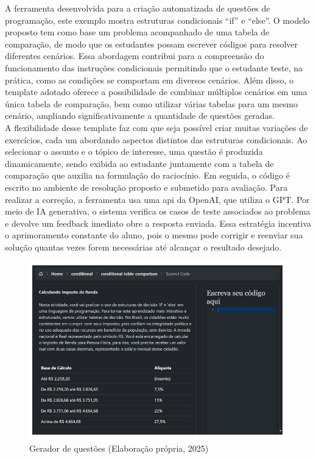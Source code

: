 A ferramenta desenvolvida para a criação automatizada de questões de programação, este exemplo mostra estruturas condicionais “if” e “else”. O modelo proposto  tem como base um problema acompanhado de uma tabela de comparação, de modo que os estudantes possam escrever códigos para resolver diferentes cenários. Essa abordagem contribui para a compreensão do funcionamento das instruções condicionais permitindo que o estudante teste, na prática, como as condições se comportam em diversos cenários. Além disso, o template adotado oferece a possibilidade de combinar múltiplos cenários em uma única tabela de comparação, bem como utilizar várias tabelas para um mesmo cenário, ampliando significativamente a quantidade de questões geradas. 
\\
A flexibilidade desse template faz com que seja possível criar muitas variações de exercícios, cada um abordando aspectos distintos das estruturas condicionais. Ao selecionar o assunto e o tópico de interesse, uma questão é produzida dinamicamente, sendo exibida ao estudante juntamente com a tabela de comparação que auxilia na formulação do raciocínio. Em seguida, o código é escrito no ambiente de resolução proposto e submetido para avaliação. Para realizar a correção, a ferramenta usa uma \gls{api} da OpenAI, que utiliza o GPT. Por meio de IA generativa, o sistema verifica os casos de teste associados ao problema e devolve um feedback imediato obre a resposta enviada. Essa estratégia incentiva o aprimoramento constante do aluno, pois o mesmo pode corrigir e reenviar sua solução quantas vezes forem necessárias até alcançar o resultado desejado. 

\begin{figure}[ht]
	\centering
	\includegraphics[width=17cm]{./imagens/capitulo7/ferramenta}
	\caption{Gerador de questões (Elaboração própria, 2025) }
	\label{fig:ferramenta}
\end{figure}

